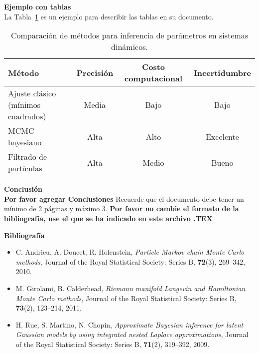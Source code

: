\documentclass[11pt]{article}
\begin{document}
\vspace{1em}
\noindent\textbf{Ejemplo con tablas}\\
La Tabla~\ref{tab:comparacion_bayes} es un ejemplo para describir las tablas en su documento.


\begin{table}[h!]
	\centering
	\begin{tabular}{|p{4.2cm}|c|c|c|}
		\hline
		\textbf{Método} & \textbf{Precisión} & \textbf{Costo computacional} & \textbf{Incertidumbre} \\
		\hline
		Ajuste clásico (mínimos cuadrados) & Media & Bajo & Bajo \\
		MCMC bayesiano & Alta & Alto & Excelente \\
		Filtrado de partículas & Alta & Medio & Bueno \\
		\hline
	\end{tabular}
	\caption{Comparación de métodos para inferencia de parámetros en sistemas dinámicos.}
	\label{tab:comparacion_bayes}
\end{table}

\vspace{1em}
\noindent\textbf{Conclusión}\\
\textbf{Por favor agregar  Conclusiones} Recuerde que el documento debe tener un mínimo de 2 páginas y máximo 3. \textbf{Por favor no cambie el formato de la bibliografía, use el que se ha indicado en este archivo .TEX}
 
\vspace{1em}
\noindent\textbf{Bibliografía}
\begin{itemize}[leftmargin=1.5em]
	\item C. Andrieu, A. Doucet, R. Holenstein, \textit{Particle Markov chain Monte Carlo methods}, Journal of the Royal Statistical Society: Series B, \textbf{72}(3), 269--342, 2010.
	\item M. Girolami, B. Calderhead, \textit{Riemann manifold Langevin and Hamiltonian Monte Carlo methods}, Journal of the Royal Statistical Society: Series B, \textbf{73}(2), 123--214, 2011.
	\item H. Rue, S. Martino, N. Chopin, \textit{Approximate Bayesian inference for latent Gaussian models by using integrated nested Laplace approximations}, Journal of the Royal Statistical Society: Series B, \textbf{71}(2), 319--392, 2009.
\end{itemize}	
\end{document}
